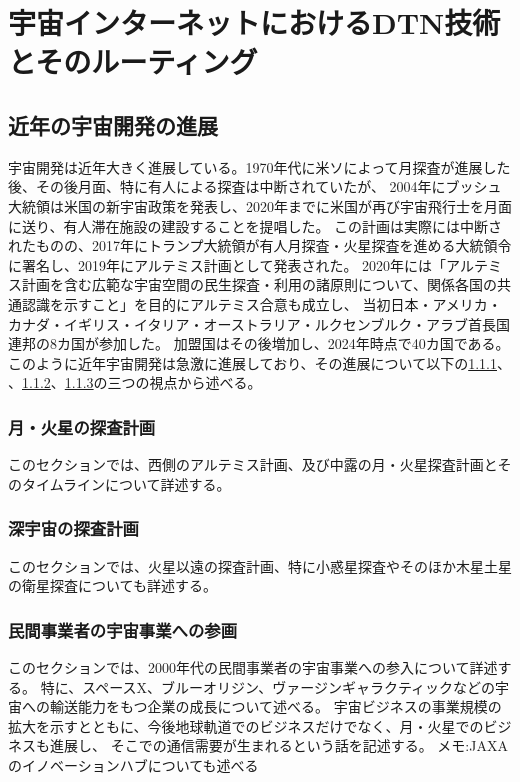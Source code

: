 \chapter{宇宙インターネットにおけるDTN技術とそのルーティング}
\label{chap:02}

\section{近年の宇宙開発の進展}
宇宙開発は近年大きく進展している。1970年代に米ソによって月探査が進展した後、その後月面、特に有人による探査は中断されていたが、
2004年にブッシュ大統領は米国の新宇宙政策を発表し、2020年までに米国が再び宇宙飛行士を月面に送り、有人滞在施設の建設することを提唱した。\cite{久保田2009}
この計画は実際には中断されたものの、2017年にトランプ大統領が有人月探査・火星探査を進める大統領令に署名し、2019年にアルテミス計画として発表された。\cite{nasa2020}
2020年には「アルテミス計画を含む広範な宇宙空間の民生探査・利用の諸原則について、関係各国の共通認識を示すこと」を目的にアルテミス合意\cite{artemis_agreement1}も成立し、
当初日本・アメリカ・カナダ・イギリス・イタリア・オーストラリア・ルクセンブルク・アラブ首長国連邦の8カ国が参加した。\cite{artemis_agreement2}
加盟国はその後増加し、2024年時点で40カ国である。\cite{artemis_agreement3}
このように近年宇宙開発は急激に進展しており、その進展について以下の\ref{月・火星の探査計画}、
、\ref{深宇宙の探査計画}、\ref{民間事業者の宇宙事業への参画}の三つの視点から述べる。


\subsection{月・火星の探査計画}
\label{月・火星の探査計画}
このセクションでは、西側のアルテミス計画、及び中露の月・火星探査計画とそのタイムラインについて詳述する。

\subsection{深宇宙の探査計画}
\label{深宇宙の探査計画}
このセクションでは、火星以遠の探査計画、特に小惑星探査やそのほか木星土星の衛星探査についても詳述する。

\subsection{民間事業者の宇宙事業への参画}
\label{民間事業者の宇宙事業への参画}
このセクションでは、2000年代の民間事業者の宇宙事業への参入について詳述する。
特に、スペースX、ブルーオリジン、ヴァージンギャラクティックなどの宇宙への輸送能力をもつ企業の成長について述べる。
宇宙ビジネスの事業規模の拡大を示すとともに、今後地球軌道でのビジネスだけでなく、月・火星でのビジネスも進展し、
そこでの通信需要が生まれるという話を記述する。
メモ:JAXAのイノベーションハブについても述べる

